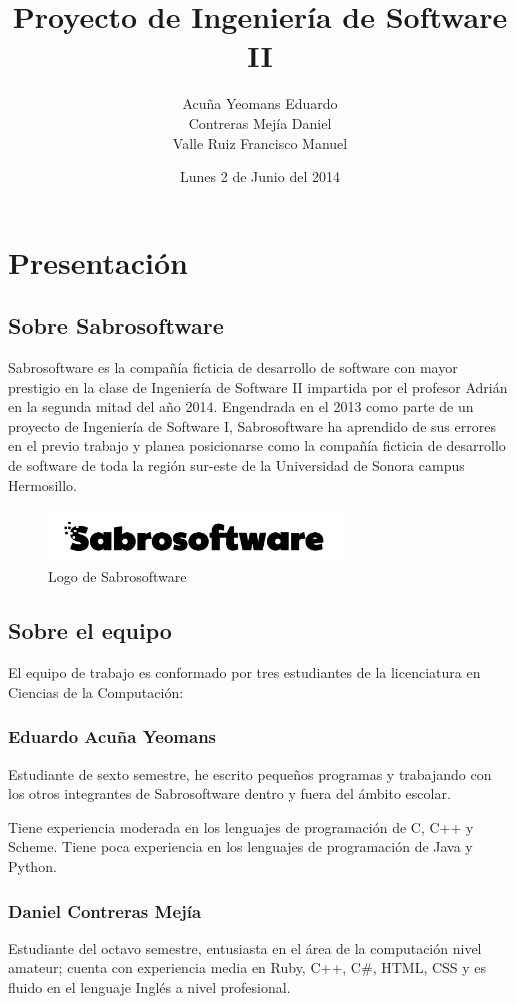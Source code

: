 \documentclass[letterpaper]{article}
\title{Proyecto de Ingeniería de Software II}
\author{Acuña Yeomans Eduardo\\Contreras Mejía Daniel\\Valle Ruiz Francisco Manuel}
\date{Lunes 2 de Junio del 2014}
\begin{document}
\maketitle

\section{Presentación}

\subsection{Sobre Sabrosoftware}
Sabrosoftware es la compañía ficticia de desarrollo de software con mayor prestigio en la clase de Ingeniería de Software II impartida por el profesor Adrián en la segunda mitad del año 2014. Engendrada en el 2013 como parte de un proyecto de Ingeniería de Software I, Sabrosoftware ha aprendido de sus errores en el previo trabajo y planea posicionarse como la compañía ficticia de desarrollo de software de toda la región sur-este de la Universidad de Sonora campus Hermosillo.

\begin{figure}[h!]
  \centering
    \includegraphics[width=0.7\textwidth]{LogoSabrosoftware}
    \caption{Logo de Sabrosoftware}
\end{figure}

\subsection{Sobre el equipo}
El equipo de trabajo es conformado por tres estudiantes de la licenciatura en Ciencias de la Computación:

\subsubsection*{Eduardo Acuña Yeomans}
Estudiante de sexto semestre, he escrito pequeños programas y trabajando con los otros integrantes de Sabrosoftware dentro y fuera del ámbito escolar.

Tiene experiencia moderada en los lenguajes de programación de C, C++ y Scheme.
Tiene poca experiencia en los lenguajes de programación de Java y Python.

\subsubsection*{Daniel Contreras Mejía}
Estudiante del octavo semestre, entusiasta en el área de la computación nivel amateur; cuenta con experiencia media en Ruby, C++, C\#, HTML, CSS y es fluido en el lenguaje Inglés a nivel profesional.
\end{document}
